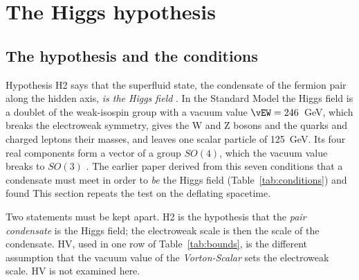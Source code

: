 \section{The Higgs hypothesis}
\label{sec:higgs}

\subsection{The hypothesis and the conditions}

Hypothesis H2 says that the superfluid state, the condensate of the fermion pair along the hidden
axis, \emph{is the Higgs field} \cite{Higgs1964}. In the Standard Model the Higgs field is a doublet
of the weak-isospin group with a vacuum value $\vEW=246$~GeV, which breaks the electroweak symmetry,
gives the W and Z bosons and the quarks and charged leptons their masses, and leaves one scalar
particle of 125~GeV. Its four real components form a vector of a group $SO(4)$, which the vacuum
value breaks to $SO(3)$ \cite{Sikivie1980}. The earlier paper derived from this seven conditions that
a condensate must meet in order to \emph{be} the Higgs field (Table~\ref{tab:conditions}) and found
 This
section repeats the test on the deflating spacetime.

Two statements must be kept apart. H2 is the hypothesis that the \emph{pair condensate} is the Higgs
field; the electroweak scale is then the scale of the condensate. HV, used in one row of
Table~\ref{tab:bounds}, is the different assumption that the vacuum value of the
\emph{Vorton-Scalar} sets the electroweak scale. HV is not examined here.

